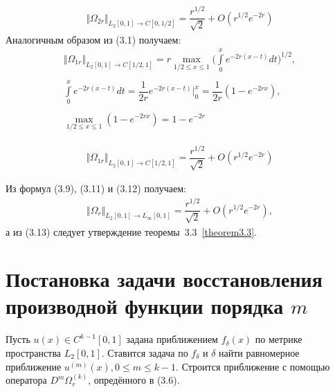 \begin{equation}
\begin{array}{c}

\Vert \Omega_{2r} \Vert_{L_2[0,1] \rightarrow C[0,1/2]} = \dfrac{r^{1/2}}{\sqrt{2}} + O(r^{1/2}e^{-2r})

\end{array}
\end{equation}
Аналогичным образом из (3.1) получаем:
\begin{equation}
\begin{array}{c}
\nonumber

\Vert \Omega_{1r} \Vert_{L_2[0,1] \rightarrow C[1/2,1]} = r \max\limits_{1/2 \leq x \leq 1} \biggl(\int\limits_0^x e^{-2r(x-t)}dt\biggr)^{1/2}, \\\\
\int\limits_0^x e^{-2r(x-t)}dt = \dfrac{1}{2r}e^{-2r(x-t)}\biggl|_0^x = \dfrac{1}{2r}(1-e^{-2rx}), \\\\
\max\limits_{1/2 \leq x \leq 1}(1-e^{-2rx}) = 1 - e^{-2r}

\end{array}
\end{equation}

\begin{equation}
\begin{array}{c}

\Vert \Omega_{1r} \Vert_{L_2[0,1] \rightarrow C[1/2,1]} = \dfrac{r^{1/2}}{\sqrt{2}} + O(r^{1/2}e^{-2r})

\end{array}
\end{equation}

Из формул (3.9), (3.11) и (3.12) получаем:
\begin{equation}
\begin{array}{c}

\Vert \Omega_{r} \Vert_{L_2[0,1] \rightarrow L_\infty[0,1]} = \dfrac{r^{1/2}}{\sqrt{2}} + O(r^{1/2}e^{-2r}),


\end{array}
\end{equation}
а из (3.13) следует утверждение теоремы~3.3~\eqref{theorem3.3}.

\section{Постановка задачи восстановления производной функции порядка $ m $}
Пусть $ u(x) \in C^{k-1}[0,1] $ задана приближением $ f_\delta(x) $ по метрике пространства $ L_2[0,1] $.
Ставится задача по $ f_\delta $ и $ \delta $ найти равномерное приближение $ u^{(m)}(x), 0 \leq m \leq k-1 $.
Строится приближение с помощью оператора $ D^m\Omega_r^{(k)} $, опредённого в (3.6).

